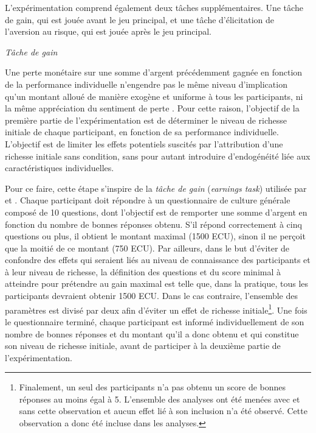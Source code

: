 \begin{Article}
\begin{refsection}[Mouminoux]
L'expérimentation comprend également deux tâches supplémentaires. Une tâche de gain, qui est jouée avant le jeu principal, et une tâche d'élicitation de l'aversion au risque, qui est jouée après le jeu principal.

\vspace{0,2cm}
\textit{Tâche de gain}

\vspace{0,2cm}
Une perte monétaire sur une somme d'argent précédemment gagnée en fonction de la performance individuelle n'engendre pas le même niveau d'implication qu'un montant alloué de manière exogène et uniforme à tous les participants, ni la même appréciation du sentiment de perte \parencite{tj90}. Pour cette raison, l'objectif de la première partie de l'expérimentation est de déterminer le niveau de richesse initiale de chaque participant, en fonction de sa performance individuelle. L'objectif est de limiter les effets potentiels suscités par l’attribution d’une richesse initiale sans condition, sans pour autant introduire d’endogénéité liée aux caractéristiques individuelles.

Pour ce faire, cette étape s'inspire de la \textit{tâche de gain} (\textit{earnings task}) utilisée par \textcite{lms09} et \textcite{bct15}. Chaque participant doit répondre à un questionnaire de culture générale composé de 10 questions, dont l'objectif est de remporter une somme d'argent en fonction du nombre de bonnes réponses obtenu. S'il répond correctement à cinq questions ou plus, il obtient le montant maximal (1500 ECU), sinon il ne perçoit que la moitié de ce montant (750 ECU). Par ailleurs, dans le but d’éviter de confondre des effets qui seraient liés au niveau de connaissance des participants et à leur niveau de richesse, la définition des questions et du score minimal à atteindre pour prétendre au gain maximal est telle que, dans la pratique, tous les participants devraient obtenir 1500 ECU. Dans le cas contraire, l’ensemble des paramètres est divisé par deux afin d’éviter un effet de richesse initiale\footnote{Finalement, un seul des participants n’a pas obtenu un score de bonnes réponses au moins égal à 5. L’ensemble des analyses ont été menées avec et sans cette observation et aucun effet lié à son inclusion n'a été observé. Cette observation a donc été incluse dans les analyses.}. Une fois le questionnaire terminé, chaque participant est informé individuellement de son nombre de bonnes réponses et du montant qu’il a donc obtenu et qui constitue son niveau de richesse initiale, avant de participer à la deuxième partie de l’expérimentation.


\end{refsection}
\end{Article}
